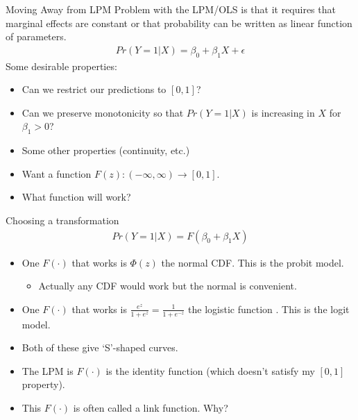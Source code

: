 \begin{frame}{Moving Away from LPM}
Problem with the LPM/OLS is that it requires that \alert{marginal effects are constant} or that probability can be written as linear function of parameters.
\begin{eqnarray*}
Pr(Y=1 | X) = \beta_0 + \beta_1 X+ \epsilon
\end{eqnarray*}
Some desirable properties:
\begin{itemize}
\item Can we restrict our predictions to $[0,1]$?
\item Can we preserve \alert{monotonicity} so that $Pr(Y=1| X)$ is increasing in $X$ for $\beta_1 >0$?
\item Some other properties (continuity, etc.) \pause
\item Want a function $F(z): (-\infty,\infty) \rightarrow [0,1]$.
\item What function will work?
\end{itemize}
\end{frame}

\begin{frame}{Choosing a transformation}
       \begin{eqnarray*}
       Pr(Y=1 | X) = F(\beta_0 + \beta_1 X)
       \end{eqnarray*}
       \begin{itemize}
       \item One $F(\cdot)$ that works is $\Phi(z)$ the normal CDF. This is the \alert{probit} model.
       \begin{itemize}
       \item Actually any CDF would work but the normal is convenient.
       \end{itemize}
       \item One $F(\cdot)$ that works is $\frac{e^z}{1+ e^z}=\frac{1}{1+e^{-z}}$ the logistic function . This is the \alert{logit} model.
       \item Both of these give `S'-shaped curves.
       \item The LPM is $F(\cdot)$ is the \alert{identity function} (which doesn't satisfy my $[0,1]$ property).
       \item This $F(\cdot)$ is often called a \alert{link function}. Why?
       \end{itemize}
\end{frame}


